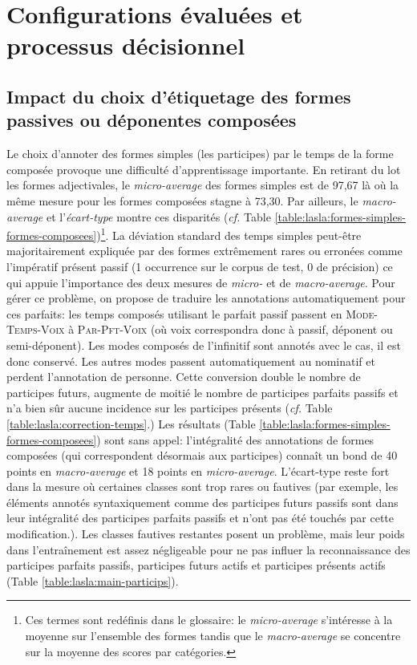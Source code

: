 \section{Configurations évaluées et processus décisionnel}

\subsection{Impact du choix d'étiquetage des formes passives ou déponentes composées}
\label{subsec:training:lasla-modification}

Le choix d'annoter des formes simples (les participes) par le temps de la forme composée provoque une difficulté d'apprentissage importante. En retirant du lot les formes adjectivales, le \textit{micro-average} des formes simples est de 97,67 là où la même mesure pour les formes composées stagne à 73,30. Par ailleurs, le \textit{macro-average} et l'\textit{écart-type} montre ces disparités (\textit{cf.} Table \ref{table:lasla:formes-simples-formes-composees})\footnote{Ces termes sont redéfinis dans le glossaire: le \textit{micro-average} s'intéresse à la moyenne sur l'ensemble des formes tandis que le \textit{macro-average} se concentre sur la moyenne des scores par catégories.}. La déviation standard des temps simples peut-être majoritairement expliquée par des formes extrêmement rares ou erronées comme l'impératif présent passif (1 occurrence sur le corpus de test, 0 de précision) ce qui appuie l'importance des deux mesures de \textit{micro-} et de \textit{macro-average}. Pour gérer ce problème, on propose de traduire les annotations automatiquement pour ces parfaits: les temps composés utilisant le parfait passif passent en \textsc{Mode-Temps-Voix} à \textsc{Par-Pft-Voix} (où voix correspondra donc à passif, déponent ou semi-déponent). Les modes composés de l'infinitif sont annotés avec le cas, il est donc conservé. Les autres modes passent automatiquement au nominatif et perdent l'annotation de personne. Cette conversion double le nombre de participes futurs, augmente de moitié le nombre de participes parfaits passifs et n'a bien sûr aucune incidence sur les participes présents (\textit{cf.} Table \ref{table:lasla:correction-temps}.) Les résultats (Table \ref{table:lasla:formes-simples-formes-composees}) sont sans appel: l'intégralité des annotations de formes composées (qui correspondent désormais aux participes) connaît un bond de 40 points en \textit{macro-average} et 18 points en \textit{micro-average}. L'écart-type reste fort dans la mesure où certaines classes sont trop rares ou fautives (par exemple, les éléments annotés syntaxiquement comme des participes futurs passifs sont dans leur intégralité des participes parfaits passifs et n'ont pas été touchés par cette modification.). Les classes fautives restantes posent un problème, mais leur poids dans l'entraînement est assez négligeable pour ne pas influer la reconnaissance des participes parfaits passifs, participes futurs actifs et participes présents actifs (Table \ref{table:lasla:main-particips}).

